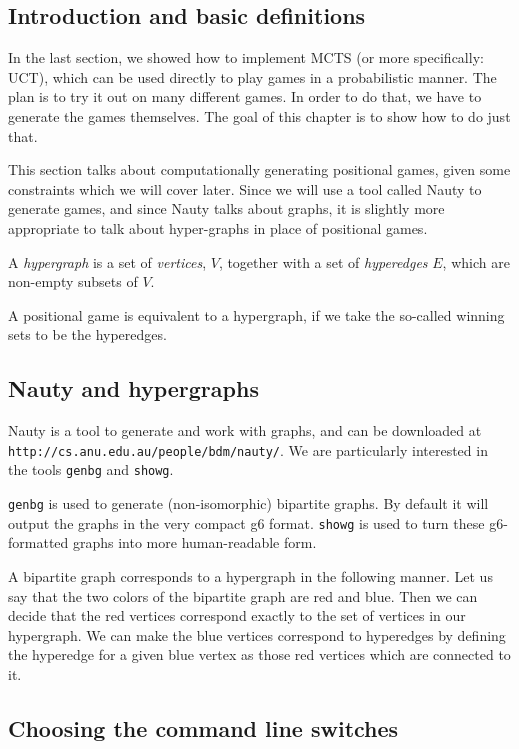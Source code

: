 \subsection{Introduction and basic definitions}

In the last section, we showed how to implement MCTS (or more specifically: UCT), which can be used directly to play games in a probabilistic manner.
The plan is to try it out on many different games.
In order to do that, we have to generate the games themselves.
The goal of this chapter is to show how to do just that.

This section talks about computationally generating positional games, given some constraints which we will cover later.
Since we will use a tool called Nauty to generate games, and since Nauty talks about graphs, it is slightly more appropriate to talk about hyper-graphs in place of positional games.

\begin{definition}
  A \emph{hypergraph} is a set of \emph{vertices}, $V$, together with a set of \emph{hyperedges} $E$, which are non-empty subsets of $V$.
\end{definition}

A positional game is equivalent to a hypergraph, if we take the so-called winning sets to be the hyperedges.

\subsection{Nauty and hypergraphs}


Nauty is a tool to generate and work with graphs, and can be downloaded at \texttt{http://cs.anu.edu.au/people/bdm/nauty/}.
We are particularly interested in the tools \texttt{genbg} and \texttt{showg}.

\texttt{genbg} is used to generate (non-isomorphic) bipartite graphs. By default it will output the graphs in the very compact g6 format.
\texttt{showg} is used to turn these g6-formatted graphs into more human-readable form.

A bipartite graph corresponds to a hypergraph in the following manner.
Let us say that the two colors of the bipartite graph are red and blue. Then we can decide that the red vertices correspond exactly to the set of vertices in our hypergraph.
We can make the blue vertices correspond to hyperedges by defining the hyperedge for a given blue vertex as those red vertices which are connected to it.


\subsection{Choosing the command line switches}
\label{sec:nautycommandline}

